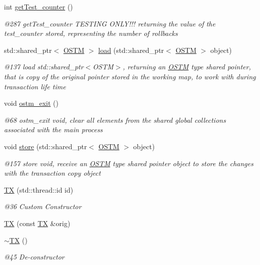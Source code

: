 \begin{DoxyCompactItemize}
int \hyperlink{class_t_x_ae9bf97930c4670f59d334b345353a71e_ae9bf97930c4670f59d334b345353a71e}{get\+Test\+\_\+counter} ()
\begin{DoxyCompactList}\small\item\em @287 get\+Test\+\_\+counter T\+E\+S\+T\+I\+NG O\+N\+L\+Y!!! returning the value of the test\+\_\+counter stored, representing the number of rollbacks \end{DoxyCompactList}\item 
std\+::shared\+\_\+ptr$<$ \hyperlink{class_o_s_t_m}{O\+S\+TM} $>$ \hyperlink{class_t_x_a1d78262b8831ddd042ed491f2e600e24_a1d78262b8831ddd042ed491f2e600e24}{load} (std\+::shared\+\_\+ptr$<$ \hyperlink{class_o_s_t_m}{O\+S\+TM} $>$ object)
\begin{DoxyCompactList}\small\item\em @137 load std\+::shared\+\_\+ptr$<$\+O\+S\+T\+M$>$, returning an \hyperlink{class_o_s_t_m}{O\+S\+TM} type shared pointer, that is copy of the original pointer stored in the working map, to work with during transaction life time \end{DoxyCompactList}\item 
void \hyperlink{class_t_x_aa9739c5c2077454c779098db7baefc2b_aa9739c5c2077454c779098db7baefc2b}{ostm\+\_\+exit} ()
\begin{DoxyCompactList}\small\item\em @68 ostm\+\_\+exit void, clear all elements from the shared global collections associated with the main process \end{DoxyCompactList}\item 
void \hyperlink{class_t_x_a7dbcb369aa4a3370b6c6829d278ece5d_a7dbcb369aa4a3370b6c6829d278ece5d}{store} (std\+::shared\+\_\+ptr$<$ \hyperlink{class_o_s_t_m}{O\+S\+TM} $>$ object)
\begin{DoxyCompactList}\small\item\em @157 store void, receive an \hyperlink{class_o_s_t_m}{O\+S\+TM} type shared pointer object to store the changes with the transaction copy object \end{DoxyCompactList}\item 
\hyperlink{class_t_x_a8a4b83eab0171ae834bfa92bbced1094_a8a4b83eab0171ae834bfa92bbced1094}{TX} (std\+::thread\+::id id)
\begin{DoxyCompactList}\small\item\em @36 Custom Constructor \end{DoxyCompactList}\item 
\hyperlink{class_t_x_ab96b3dd2bfd621b47307f0af3ec4f35c_ab96b3dd2bfd621b47307f0af3ec4f35c}{TX} (const \hyperlink{class_t_x}{TX} \&orig)
\item 
\hyperlink{class_t_x_abecf854cc3228ab6dd51175b3cd1c70a_abecf854cc3228ab6dd51175b3cd1c70a}{$\sim$\+TX} ()
\begin{DoxyCompactList}\small\item\em @45 De-\/constructor \end{DoxyCompactList}\end{DoxyCompactItemize}
